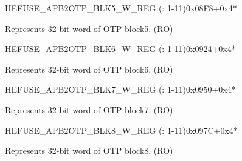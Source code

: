 \begin{register}{H}{EFUSE\_APB2OTP\_BLK5\_W\_REG (: 1-11)}{0x08F8+0x4*}\label{regdesc:EFUSEAPB2OTPBLK5WNREG}
%
\regnewline%
\begin{regdesc}\begin{reglist}
\label{fielddesc:EFUSEAPB2OTPBLOCK5WN}\item [EFUSE\_APB2OTP\_BLOCK5\_W\regindex{n}] Represents 32-bit word  of OTP block5. (RO)
\end{reglist}\end{regdesc}
\end{register}

\begin{register}{H}{EFUSE\_APB2OTP\_BLK6\_W\_REG (: 1-11)}{0x0924+0x4*}\label{regdesc:EFUSEAPB2OTPBLK6WNREG}
%
\regnewline%
\begin{regdesc}\begin{reglist}
\label{fielddesc:EFUSEAPB2OTPBLOCK6WN}\item [EFUSE\_APB2OTP\_BLOCK6\_W\regindex{n}] Represents 32-bit word  of OTP block6. (RO)
\end{reglist}\end{regdesc}
\end{register}

\begin{register}{H}{EFUSE\_APB2OTP\_BLK7\_W\_REG (: 1-11)}{0x0950+0x4*}\label{regdesc:EFUSEAPB2OTPBLK7WNREG}
%
\regnewline%
\begin{regdesc}\begin{reglist}
\label{fielddesc:EFUSEAPB2OTPBLOCK7WN}\item [EFUSE\_APB2OTP\_BLOCK7\_W\regindex{n}] Represents 32-bit word  of OTP block7. (RO)
\end{reglist}\end{regdesc}
\end{register}

\begin{register}{H}{EFUSE\_APB2OTP\_BLK8\_W\_REG (: 1-11)}{0x097C+0x4*}\label{regdesc:EFUSEAPB2OTPBLK8WNREG}
%
\regnewline%
\begin{regdesc}\begin{reglist}
\label{fielddesc:EFUSEAPB2OTPBLOCK8WN}\item [EFUSE\_APB2OTP\_BLOCK8\_W\regindex{n}] Represents 32-bit word  of OTP block8. (RO)
\end{reglist}\end{regdesc}
\end{register}

